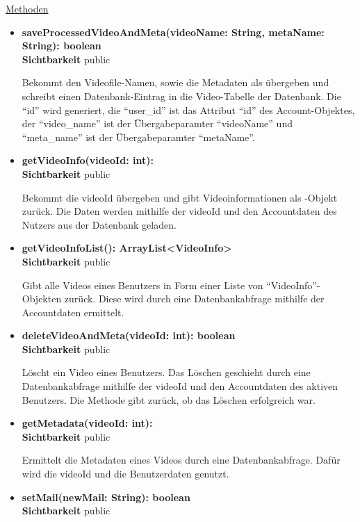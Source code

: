 \underline{Methoden}
\begin{itemize}
\itemsep0pt
\item \textbf{saveProcessedVideoAndMeta(videoName: String, metaName: String): boolean}\hfill\\
\textbf{Sichtbarkeit} public

Bekommt den Videofile-Namen, sowie die Metadaten als übergeben und schreibt einen Datenbank-Eintrag in die Video-Tabelle der Datenbank. Die ``id'' wird generiert, die ``user\_id'' ist das Attribut ``id'' des Account-Objektes, der ``video\_name'' ist der Übergabeparamter ``videoName'' und ``meta\_name'' ist der Übergabeparamter ``metaName''.

\item \textbf{getVideoInfo(videoId: int): }\hfill\\
\textbf{Sichtbarkeit} public

Bekommt die videoId übergeben und gibt Videoinformationen als -Objekt zurück. Die Daten werden mithilfe der videoId und den Accountdaten des Nutzers aus der Datenbank geladen.

\item \textbf{getVideoInfoList(): ArrayList<VideoInfo>}\hfill\\
\textbf{Sichtbarkeit} public

Gibt alle Videos eines Benutzers in Form einer Liste von ``VideoInfo''-Objekten zurück. Diese wird durch eine Datenbankabfrage mithilfe der Accountdaten ermittelt.

\item \textbf{deleteVideoAndMeta(videoId: int): boolean}\hfill\\
\textbf{Sichtbarkeit} public

Löscht ein Video eines Benutzers. Das Löschen geschieht durch eine Datenbankabfrage mithilfe der videoId und den Accountdaten des aktiven Benutzers. Die Methode gibt zurück, ob das Löschen erfolgreich war.

\item \textbf{getMetadata(videoId: int): }\hfill\\
\textbf{Sichtbarkeit} public

Ermittelt die Metadaten eines Videos durch eine Datenbankabfrage. Dafür wird die videoId und die Benutzerdaten genutzt.

\item \textbf{setMail(newMail: String): boolean}\hfill\\
\textbf{Sichtbarkeit} public


\end{itemize}
